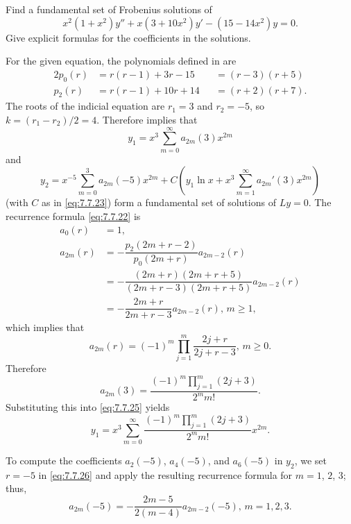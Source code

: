\begin{example}\label{example:7.7.3}
Find a fundamental set of Frobenius  solutions of
\[
x^2(1+x^2)y''+x(3+10x^2)y'-(15-14x^2)y=0.
\]
Give explicit  formulas for the coefficients in the solutions.
\end{example}

\begin{solution}
For  the given equation, the polynomials defined in
 are
\begin{alignat*}{2}
p_0(r)&=r(r-1)+3r-15&&=(r-3)(r+5)\\
p_2(r)&=r(r-1)+10r+14&&=(r+2)(r+7).
\end{alignat*}
The roots of the indicial equation are $r_1=3$ and $r_2=-5$,
so $k=(r_1-r_2)/2=4$. Therefore  implies that
\begin{equation} \label{eq:7.7.25}
y_1=x^3\sum_{m=0}^\infty a_{2m}(3)x^{2m}
\end{equation}
and
\[
y_2=x^{-5}\sum_{m=0}^3 a_{2m}(-5)x^{2m}+C
\left(y_1\ln x+x^3\sum_{m=1}^\infty a_{2m}'(3)x^{2m}\right)
\]
(with $C$ as in \eqref{eq:7.7.23})
form a fundamental set of solutions of $Ly=0$. The recurrence formula
\eqref{eq:7.7.22} is
\begin{equation} \label{eq:7.7.26}
\begin{aligned}
a_0(r)&=1,\\
a_{2m}(r)&=-\dfrac{p_2(2m+r-2)}{p_0(2m+r)}a_{2m-2}(r)\\
&=-\dfrac{(2m+r)(2m+r+5)}{(2m+r-3)(2m+r+5)}a_{2m-2}(r)\\
&=-\dfrac{2m+r}{2m+r-3}a_{2m-2}(r),\,m\ge1,
\end{aligned}
\end{equation}
which implies that
\begin{equation} \label{eq:7.7.27}
a_{2m}(r)=(-1)^m\prod_{j=1}^m\frac{2j+r}{2j+r-3},\,m\ge0.
\end{equation}
Therefore
\begin{equation} \label{eq:7.7.28}
a_{2m}(3)=\frac{(-1)^m\prod_{j=1}^m(2j+3)}{2^mm!}.
\end{equation}
Substituting this into \eqref{eq:7.7.25} yields
\[
y_1=x^3\sum_{m=0}^\infty
\frac{(-1)^m\prod_{j=1}^m(2j+3)}{2^mm!}x^{2m}.
\]

To compute the coefficients $a_2(-5)$, $a_4(-5)$, and $a_6(-5)$ in
$y_2$, we
set $r=-5$ in \eqref{eq:7.7.26} and apply the resulting recurrence
formula for $m=1$, $2$,  $3$;   thus,
\[
a_{2m}(-5)=-\frac{2m-5}{2(m-4)}a_{2m-2}(-5),\,m=1,2,3.
\]


\end{solution}
